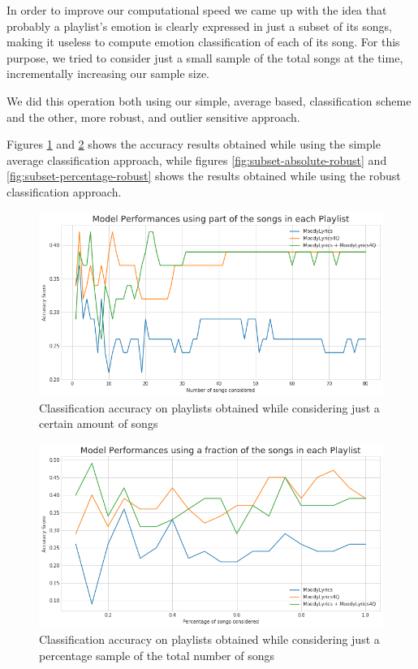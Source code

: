 In order to improve our computational speed we came up with the idea that probably a playlist's emotion is clearly expressed in just a subset of its songs, making it useless to compute emotion classification of each of its song. For this purpose, we tried to consider just a small sample of the total songs at the time, incrementally increasing our sample size.

We did this operation both using our simple, average based, classification scheme and the other, more robust, and outlier sensitive approach.

Figures \ref{fig:subset-absolute} and \ref{fig:subset-percentage} shows the accuracy results obtained while using the simple average classification approach, while figures \ref{fig:subset-absolute-robust} and \ref{fig:subset-percentage-robust} shows the results obtained while using the robust classification approach.

\begin{figure}[H]
\centering
\includegraphics[width=1\textwidth]{./chapters/chapter5/images/subset-absolute}
\caption{Classification accuracy on playlists obtained while considering just a certain amount of songs}
\label{fig:subset-absolute}
\end{figure}

\begin{figure}[H]
\centering
\includegraphics[width=1\textwidth]{./chapters/chapter5/images/subset-percentage}
\caption{Classification accuracy on playlists obtained while considering just a percentage sample of the total number of songs}
\label{fig:subset-percentage}
\end{figure}

